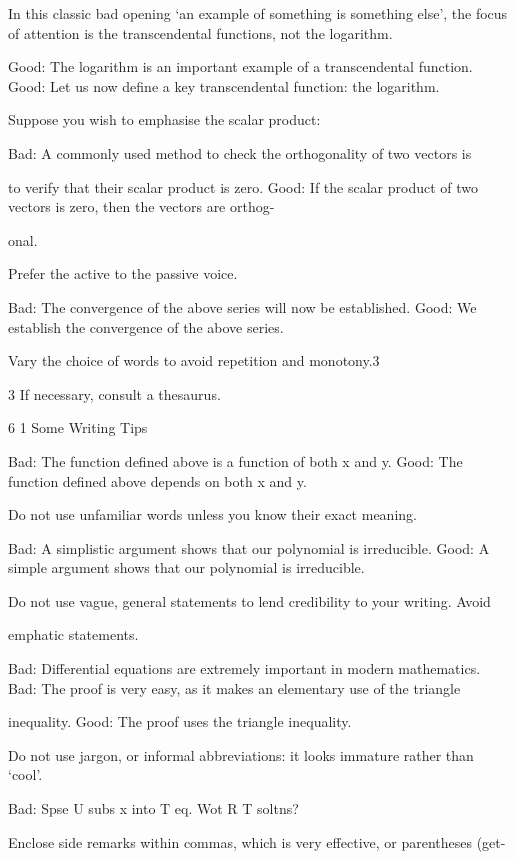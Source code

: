 \documentclass[11pt]{article}
\theoremstyle{plain}
\theoremstyle{definition}
\begin{document}
In this classic bad opening `an example of something is something else', the focus of attention is the transcendental functions, not the logarithm.

Good: The logarithm is an important example of a transcendental function. Good: Let us now define a key transcendental function: the logarithm.

Suppose you wish to emphasise the scalar product:

Bad: A commonly used method to check the orthogonality of two vectors is

to verify that their scalar product is zero. Good: If the scalar product of two vectors is zero, then the vectors are orthog-

onal.

\textbullet{} Prefer the active to the passive voice.

Bad: The convergence of the above series will now be established. Good: We establish the convergence of the above series.

\textbullet{} Vary the choice of words to avoid repetition and monotony.3

3 If necessary, consult a thesaurus.

6 1 Some Writing Tips

Bad: The function defined above is a function of both x and y. Good: The function defined above depends on both x and y.

\textbullet{} Do not use unfamiliar words unless you know their exact meaning.

Bad: A simplistic argument shows that our polynomial is irreducible. Good: A simple argument shows that our polynomial is irreducible.

\textbullet{} Do not use vague, general statements to lend credibility to your writing. Avoid

emphatic statements.

Bad: Differential equations are extremely important in modern mathematics. Bad: The proof is very easy, as it makes an elementary use of the triangle

inequality. Good: The proof uses the triangle inequality.

\textbullet{} Do not use jargon, or informal abbreviations: it looks immature rather than `cool'.

Bad: Spse U subs x into T eq. Wot R T soltns?

\textbullet{} Enclose side remarks within commas, which is very effective, or parentheses (get-
\end{document}
